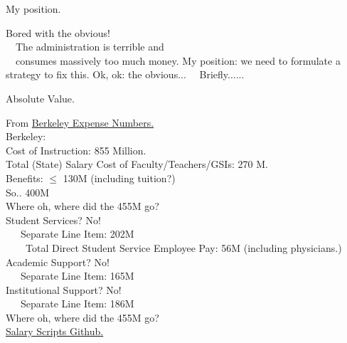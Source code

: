 \documentclass[hyperref={colorlinks}]{beamer}
\newcommand{\skippause}{\vskip5pt
\pause}
\begin{document}
\small
\begin{frame}{My position.}

Bored with the obvious! \\ 
~~The administration is terrible and \\
~~consumes massively too much money.
\skippause
My position: we need to formulate a strategy to fix this.
\skippause
Ok, ok: the obvious...
\skippause
~~Briefly......

\end{frame}

\begin{frame}{Absolute Value.}

From \href{http://reportingtransparency.universityofcalifornia.edu/}{Berkeley Expense Numbers.} \\

Berkeley: \\

Cost of Instruction: {\color{red} 855 Million.} \\
\skippause
Total (State) Salary Cost of Faculty/Teachers/GSIs: {\color{blue} 270 M.} \\
Benefits: {\color{blue} $\leq$ 130M (including tuition?)} \\
So..{\color{blue} 400M} \\ 
\skippause
Where oh, where did the {\color{red} 455M} go? \\
\skippause
Student Services? No! \\
~~~Separate Line Item: {\color{green} 202M}\\
~~~~Total Direct Student Service Employee Pay: {\color{blue} 56M} (including physicians.)\\
\skippause
Academic Support? No! \\ 
~~~Separate Line Item: {\color{green} 165M} \\
\skippause
Institutional Support? No! \\
~~~Separate Line Item: {\color{green} 186M}  \\
\skippause
Where oh, where did the {\color{red} 455M} go? \\
{\tiny \href{https://github.com/satish0rao/uc-berkeley-finance-analysis}{Salary Scripts Github.}}
\end{frame}
\end{document}

